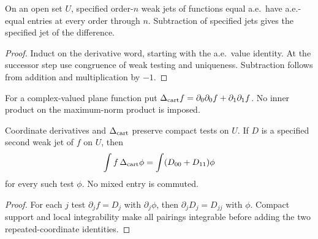 \begin{lemma}
\label{lem:weak-jet-ae-comparison}
\leanok
On an open set $U$, specified order-$n$ weak jets of functions equal a.e.\
have a.e.-equal entries at every order through $n$.
Subtraction of specified jets gives the specified jet of the difference.
\end{lemma}

\begin{proof}
\leanok
Induct on the derivative word, starting with the a.e.\ value identity.
At the successor step use congruence of weak testing and uniqueness.
Subtraction follows from addition and multiplication by $-1$.
\end{proof}

\begin{definition}
\label{def:cartesian-test-laplacian}
\leanok
For a complex-valued plane function put
$\Delta_{\rm cart}f=\partial_0\partial_0f+\partial_1\partial_1f$.
No inner product on the maximum-norm product is imposed.
\end{definition}

\begin{lemma}
\label{lem:weak-jet-laplacian-test}
\leanok
Coordinate derivatives and $\Delta_{\rm cart}$ preserve compact tests on $U$.
If $D$ is a specified second weak jet of $f$ on $U$, then
\[
 \int f\,\Delta_{\rm cart}\phi
   =\int(D_{00}+D_{11})\phi
\]
for every such test $\phi$. No mixed entry is commuted.
\end{lemma}

\begin{proof}
\leanok
For each $j$ test $\partial_jf=D_j$ with $\partial_j\phi$, then
$\partial_jD_j=D_{jj}$ with $\phi$.
Compact support and local integrability make all pairings integrable before
adding the two repeated-coordinate identities.
\end{proof}

